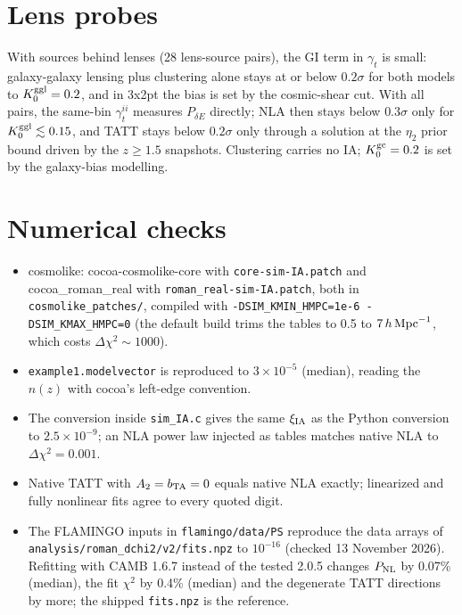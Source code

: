 \documentclass[11pt]{article}
\newcommand{\hMpc}{\,h\,{\rm Mpc}^{-1}}
\newcommand{\dchi}{\Delta\chi^2}
\newcommand{\PNL}{P_{\rm NL}}
\newcommand{\PdE}{P_{\delta E}}
\begin{document}
\section{Lens probes}
\label{app:lens}

With sources behind lenses (28 lens-source pairs), the GI term in
$\gamma_t$ is small: galaxy-galaxy lensing plus clustering alone stays
at or below $0.2\sigma$ for both models to $K_0^{\rm ggl} = 0.2$, and in
3x2pt the bias is set by the cosmic-shear cut. With all pairs, the
same-bin $\gamma_t^{ii}$ measures $\PdE$ directly; NLA then stays
below $0.3\sigma$ only for $K_0^{\rm ggl} \lesssim 0.15$, and TATT stays below $0.2\sigma$ only
through a solution at the $\eta_2$ prior bound driven by the $z \ge
1.5$ snapshots. Clustering carries no IA; $K_0^{\rm gc} = 0.2$ is set
by the galaxy-bias modelling.

\section{Numerical checks}
\label{app:checks}

\begin{itemize}\sloppy
  \item cosmolike: cocoa-cosmolike-core with \texttt{core-sim-IA.patch}
    and cocoa\_roman\_real with \texttt{roman\_real-sim-IA.patch}, both
    in \texttt{cosmolike\_patches/}, compiled with
    \texttt{-DSIM\_KMIN\_HMPC=1e-6 -DSIM\_KMAX\_HMPC=0} (the default
    build trims the tables to 0.5 to $7\hMpc$, which costs $\dchi \sim
    1000$).
  \item \texttt{example1.modelvector} is reproduced to $3\times10^{-5}$
    (median), reading the $n(z)$ with cocoa's left-edge convention.
  \item The conversion inside \texttt{sim\_IA.c} gives the same
    $\xi_{\rm IA}$ as the Python conversion to $2.5\times10^{-9}$; an
    NLA power law injected as tables matches native NLA to $\dchi =
    0.001$.
  \item Native TATT with $A_2 = b_{\rm TA} = 0$ equals native NLA
    exactly; linearized and fully nonlinear fits agree to every quoted
    digit.
  \item The FLAMINGO inputs in \texttt{flamingo/data/PS} reproduce the
    data arrays of \texttt{analysis/roman\_dchi2/v2/fits.npz} to
    $10^{-16}$ (checked 13 November 2026). Refitting with CAMB 1.6.7
    instead of the tested 2.0.5 changes $\PNL$ by 0.07\% (median), the
    fit $\chi^2$ by 0.4\% (median) and the degenerate TATT directions by
    more; the shipped \texttt{fits.npz} is the reference.
\end{itemize}
\end{document}
